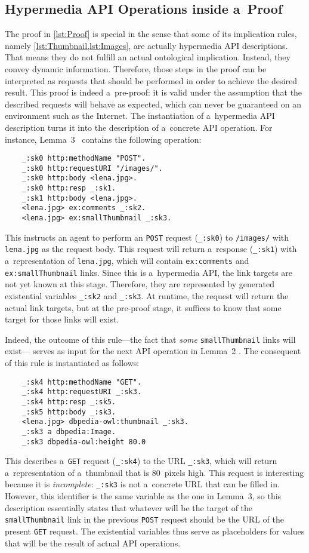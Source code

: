 \subsection{Hypermedia API Operations inside a~Proof}
The proof in \cref{lst:Proof} is special
in the sense that some of its implication rules,
namely \cref{lst:Thumbnail,lst:Images},
are actually hypermedia API descriptions.
That means they do not fulfill an actual ontological implication.
Instead, they convey dynamic information.
Therefore, those steps in the proof
can be interpreted as \http requests that should be performed
in order to achieve the desired result.
This proof is indeed a~pre-proof:
it is valid under the assumption
that the described \http requests will behave as expected,
which can never be guaranteed on an environment such as the Internet.
The instantiation of a~hypermedia API description
turns it into the description of a~concrete API operation.
For instance, Lemma~3~ contains the following operation:
\begin{Verbatim}
    _:sk0 http:methodName "POST".
    _:sk0 http:requestURI "/images/".
    _:sk0 http:body <lena.jpg>.
    _:sk0 http:resp _:sk1.
    _:sk1 http:body <lena.jpg>.
    <lena.jpg> ex:comments _:sk2.
    <lena.jpg> ex:smallThumbnail _:sk3.
\end{Verbatim}
This instructs an agent to perform
an \http \verb!POST! request (\verb!_:sk0!) to \verb!/images/!
with \verb!lena.jpg! as the request body.
This request will return a~response (\verb!_:sk1!)
with a~representation of \verb!lena.jpg!,
which will contain \verb!ex:comments! and \verb!ex:smallThumbnail! links.
Since this is a~hypermedia API,
the link targets are not yet known at this stage.
Therefore, they are represented by generated existential variables \verb!_:sk2! and \verb!_:sk3!.
At runtime, the \http request will return the actual link targets,
but at the pre-proof stage,
it suffices to know that some target for those links will exist.

Indeed, the outcome of this rule---the fact that \emph{some} \verb!smallThumbnail! links will exist---%
serves as input for the next API operation in Lemma~2 .
The consequent of this rule is instantiated as follows:
\begin{Verbatim}
    _:sk4 http:methodName "GET".
    _:sk4 http:requestURI _:sk3.
    _:sk4 http:resp _:sk5.
    _:sk5 http:body _:sk3.
    <lena.jpg> dbpedia-owl:thumbnail _:sk3.
    _:sk3 a dbpedia:Image.
    _:sk3 dbpedia-owl:height 80.0
\end{Verbatim}
This describes a~\verb!GET! request (\verb!_:sk4!) to the URL \verb!_:sk3!,
which will return a~representation of a~thumbnail that is 80~pixels high.
This request is interesting because it is \emph{incomplete}:
\verb!_:sk3! is not a~concrete URL that can be filled in. 
However, this identifier is the same variable as the one in Lemma~3,
so this description essentially states
that whatever will be the target of the \verb!smallThumbnail! link in the previous \verb!POST! request
should be the URL of the present \verb!GET! request.
The existential variables thus serve as placeholders
for values that will be the result of actual API operations.

